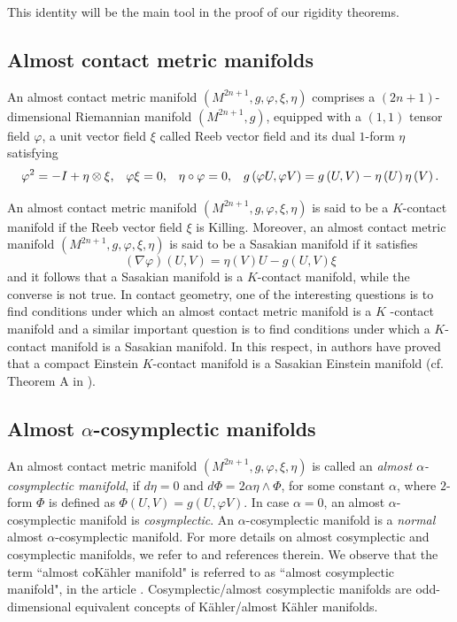 \documentclass[a4paper, twoside, 10pt]{article}
\numberwithin{equation}{section}
\theoremstyle{definition}
\begin{document}
This identity will be the main tool in the proof of our rigidity
theorems.

\subsection{Almost contact metric manifolds}

An almost contact metric manifold $\left( M^{2n+1},g, \varphi,\xi ,\eta
\right) $ comprises a $(2n+1)$-dimensional Riemannian manifold $\left(
M^{2n+1},g\right)$, equipped with a $(1,1)$ tensor field $\varphi$, a unit
vector field $\xi $ called Reeb vector field and its dual $1$-form $\eta$
satisfying
\[
 {\varphi}^{2}=-I+\eta \otimes \xi \text{,\quad } \varphi \xi =0\text{,\quad }%
\eta \circ \varphi =0\text{,\quad }g\left( \varphi U, \varphi V\right)
=g\left( U,V\right) -\eta \left( U\right) \eta \left( V\right) \text{.}
\]

An almost contact metric manifold $\left( M^{2n+1},g,\varphi ,\xi ,\eta
\right) $ is said to be a $K$-contact manifold if the Reeb vector field $\xi 
$ is Killing. Moreover, an almost contact metric manifold $\left(
M^{2n+1},g,\varphi ,\xi ,\eta \right) $ is said to be a Sasakian manifold if
it satisfies
\[
\left( \nabla \varphi \right) \left( U,V\right) =\eta \left( V\right)
U-g\left( U,V\right) \xi 
\]
and it follows that a Sasakian manifold is a $K$-contact manifold, while the
converse is not true. In contact geometry, one of the interesting questions
is to find conditions under which an almost contact metric manifold is a $K$%
-contact manifold and a similar important question is to find conditions under
which a $K$-contact manifold is a Sasakian manifold. In this respect, in \cite{boyer2001einstein}
authors have proved that a compact Einstein $K$-contact manifold is a
Sasakian Einstein manifold (cf. Theorem A in \cite{boyer2001einstein}).


\subsection{Almost \texorpdfstring{$\alpha$}{alpha}-cosymplectic manifolds}

 An almost contact metric manifold 
$\left(M^{2n+1},g, \varphi, \xi ,\eta \right)$ 
is called an  \textit{almost $\alpha$-cosymplectic manifold}, if $d\eta=0$ and $d \Phi=2\alpha\eta\wedge \Phi$, for some constant $\alpha$, where $2$-form $\Phi$ is defined as $\Phi(U,V)=g(U, \varphi V)$. 
In case $\alpha=0$,  an almost $\alpha$-cosymplectic manifold is \textit{cosymplectic}. 
An $\alpha$-cosymplectic manifold is a {\it normal} almost $\alpha$-cosymplectic manifold. 
For more details on almost cosymplectic and cosymplectic manifolds, we refer to \cite{perrone2018classification}
and references therein.
 We observe that the term 
``almost coK\"{a}hler manifold" is referred to as
``almost cosymplectic manifold", in the article
\cite{perrone2018classification}.
Cosymplectic/almost cosymplectic manifolds are odd-dimensional equivalent concepts of K\"{a}hler/almost K\"{a}hler manifolds. 
\end{document}
